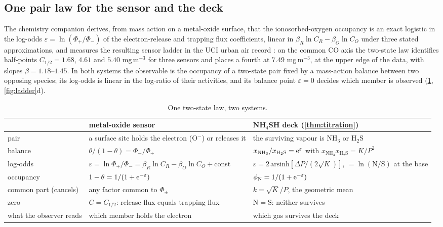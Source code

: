 \documentclass[11pt]{article}
\theoremstyle{definition}\newtheorem{definition}[theorem]{Definition}
\theoremstyle{remark}\newtheorem{remark}[theorem]{Remark}
\newcommand{\NH}{\mathrm{NH_3}}\newcommand{\HS}{\mathrm{H_2S}}\newcommand{\NHSH}{\mathrm{NH_4SH}}
\begin{document}
\subsection{One pair law for the sensor and the deck}\label{sec:pairlaw}
The chemistry companion \cite{SChem} derives, from mass action on a metal-oxide surface, that the ionosorbed-oxygen occupancy is an exact logistic in the log-odds $\varepsilon=\ln(\Phi_+/\Phi_-)$ of the electron-release and trapping flux coefficients, linear in $\beta_R\ln C_R-\beta_O\ln C_O$ under three stated approximations, and measures the resulting sensor ladder in the UCI urban air record \cite{UCI,DeVito}: on the common CO axis the two-state law identifies half-points $C_{1/2}=1.68$, $4.61$ and $5.40$ mg\,m$^{-3}$ for three sensors and places a fourth at $7.49$ mg\,m$^{-3}$, at the upper edge of the data, with slopes $\beta=1.18$--$1.45$. In both systems the observable is the occupancy of a two-state pair fixed by a mass-action balance between two opposing species; its log-odds is linear in the log-ratio of their activities, and its balance point $\varepsilon=0$ decides which member is observed (\cref{tab:pairlaw}, \cref{fig:ladder}d).

\begin{table}[!htb]\centering\footnotesize
\begin{tabular}{@{}>{\raggedright\arraybackslash}p{2.6cm}>{\raggedright\arraybackslash}p{5.6cm}>{\raggedright\arraybackslash}p{5.6cm}@{}}\toprule
 & metal-oxide sensor \cite{SChem} & NH$_4$SH deck (\cref{thm:titration})\\\midrule
pair & a surface site holds the electron (O$^-$) or releases it & the surviving vapour is NH$_3$ or H$_2$S\\
balance & $\theta/(1-\theta)=\Phi_-/\Phi_+$ & $x_{\NH}/x_{\HS}=\e^{\varepsilon}$ with $x_{\NH}x_{\HS}=K/P^2$\\
log-odds & $\varepsilon=\ln\Phi_+/\Phi_-=\beta_R\ln C_R-\beta_O\ln C_O+$const & $\varepsilon=2\,\mathrm{arsinh}[\Delta P/(2\sqrt K)]$, $=\ln(\mathrm N/\mathrm S)$ at the base\\
occupancy & $1-\theta=1/(1+\mathrm e^{-\varepsilon})$ & $\phi_\mathrm{N}=1/(1+\mathrm e^{-\varepsilon})$\\
common part (cancels) & any factor common to $\Phi_\pm$ & $k=\sqrt K/P$, the geometric mean\\
zero & $C=C_{1/2}$: release flux equals trapping flux & $\mathrm N=\mathrm S$: neither survives\\
what the observer reads & which member holds the electron & which gas survives the deck\\\bottomrule
\end{tabular}
\caption{One two-state law, two systems.}\label{tab:pairlaw}
\end{table}
\end{document}
